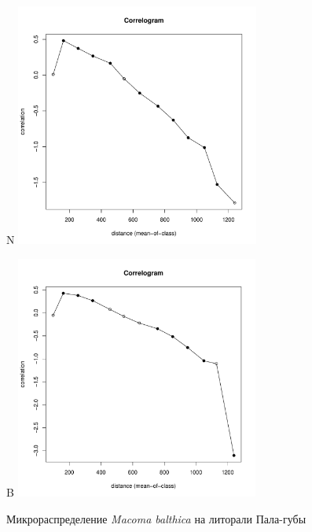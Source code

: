 	\begin{figure}[h]

	\begin{minipage}[b]{.5\linewidth}
	\begin{center}
	{\small N}
		\includegraphics[width=80mm]{../Barenc_Sea/distribution_Moran/Pala_moran_N_Macoma_balthica_.pdf}
	\end{center}
	\end{minipage}
	\hfil %
	\begin{minipage}[b]{.5\linewidth}
	\begin{center}
	{\small B}
		\includegraphics[width=80mm]{../Barenc_Sea/distribution_Moran/Pala_moran_B_Macoma_balthica_.pdf}
	\end{center}
	\end{minipage}
	\caption{Микрораспределение {\it Macoma balthica} на литорали Пала-губы}
	\label{ris:moransI_Pala_Macoma}
	\end{figure}


